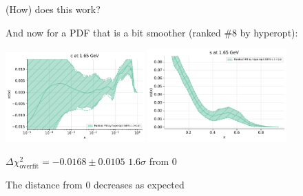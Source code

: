 \documentclass[aspectratio=169,11pt]{beamer}
\begin{document}
\begin{frame}[t]{(How) does this work?}

  And now for a PDF that is a bit smoother (ranked \#8 by hyperopt):

  \begin{center}
    \includegraphics[width=0.4\textwidth]{better_fit_charm_plot_pdfs_c.pdf}
    \includegraphics[width=0.4\textwidth]{better_fit_strange_plot_pdfs_s.pdf}
  \end{center}

  \begin{center}
    $\Delta\chi^2_{\text{overfit}}=-0.0168 \pm 0.0105$ \quad $1.6\sigma$ from 0
  \end{center}
  The distance from 0 decreases as expected

\end{frame}
\end{document}
